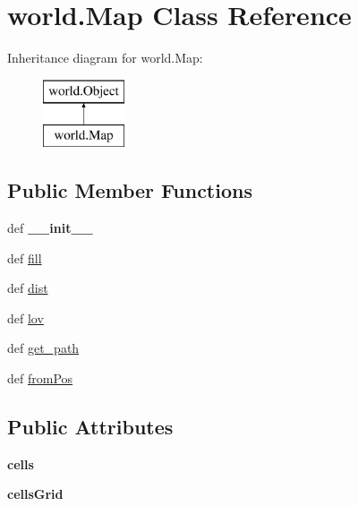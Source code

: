 \hypertarget{classworld_1_1_map}{\section{world.\-Map \-Class \-Reference}
\label{classworld_1_1_map}
}
\-Inheritance diagram for world.\-Map\-:\begin{figure}[H]
\begin{center}
\leavevmode
\includegraphics[height=2.000000cm]{classworld_1_1_map}
\end{center}
\end{figure}
\subsection*{\-Public \-Member \-Functions}
\begin{DoxyCompactItemize}
\item 
\hypertarget{classworld_1_1_map_aabfde95675f6b82d9a8afcd676053632}{def {\bfseries \-\_\-\-\_\-init\-\_\-\-\_\-}}\label{classworld_1_1_map_aabfde95675f6b82d9a8afcd676053632}

\item 
def \hyperlink{classworld_1_1_map_ac8e650b696f537d9df20ee5d2243e978}{fill}
\item 
def \hyperlink{classworld_1_1_map_ac5f255ae58db6b391d0a3d5807365370}{dist}
\item 
def \hyperlink{classworld_1_1_map_a7b1d3e4419fd5bd48d5f759e63ae55f5}{lov}
\item 
def \hyperlink{classworld_1_1_map_aabdd46688167e96753c73df0f0486588}{get\-\_\-path}
\item 
def \hyperlink{classworld_1_1_map_a12e89884cc3e9da4d024575a85b1d324}{from\-Pos}
\end{DoxyCompactItemize}
\subsection*{\-Public \-Attributes}
\begin{DoxyCompactItemize}
\item 
\hypertarget{classworld_1_1_map_af412cfb2a5b25f4ca3188498f916a647}{{\bfseries cells}}\label{classworld_1_1_map_af412cfb2a5b25f4ca3188498f916a647}

\item 
\hypertarget{classworld_1_1_map_aec6e18657e8d65b1ab57cdf305e2de37}{{\bfseries cells\-Grid}}\label{classworld_1_1_map_aec6e18657e8d65b1ab57cdf305e2de37}

\end{DoxyCompactItemize}


